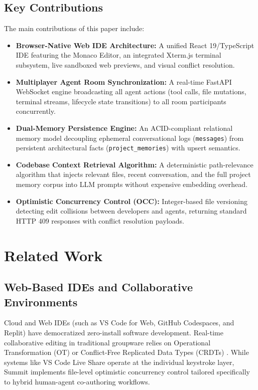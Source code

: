 \documentclass[conference]{IEEEtran}
\begin{document}
\subsection{Key Contributions}
The main contributions of this paper include:
\begin{itemize}
    \item \textbf{Browser-Native Web IDE Architecture:} A unified React 19/TypeScript IDE featuring the Monaco Editor, an integrated Xterm.js terminal subsystem, live sandboxed web previews, and visual conflict resolution.
    \item \textbf{Multiplayer Agent Room Synchronization:} A real-time FastAPI WebSocket engine broadcasting all agent actions (tool calls, file mutations, terminal streams, lifecycle state transitions) to all room participants concurrently.
    \item \textbf{Dual-Memory Persistence Engine:} An ACID-compliant relational memory model decoupling ephemeral conversational logs (\texttt{messages}) from persistent architectural facts (\texttt{project\_memories}) with upsert semantics.
    \item \textbf{Codebase Context Retrieval Algorithm:} A deterministic path-relevance algorithm that injects relevant files, recent conversation, and the full project memory corpus into LLM prompts without expensive embedding overhead.
    \item \textbf{Optimistic Concurrency Control (OCC):} Integer-based file versioning detecting edit collisions between developers and agents, returning standard HTTP 409 responses with conflict resolution payloads.
\end{itemize}

\section{Related Work}

\subsection{Web-Based IDEs and Collaborative Environments}
Cloud and Web IDEs (such as VS Code for Web, GitHub Codespaces, and Replit) have democratized zero-install software development. Real-time collaborative editing in traditional groupware relies on Operational Transformation (OT) \cite{ellis1989ot} or Conflict-Free Replicated Data Types (CRDTs) \cite{oster2006crdt}. While systems like VS Code Live Share operate at the individual keystroke layer, Summit implements file-level optimistic concurrency control tailored specifically to hybrid human-agent co-authoring workflows.
\end{document}
